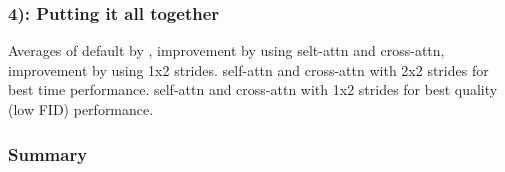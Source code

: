 \begin{figure}[!htb]
    
    
\end{figure}



\newpage
\subsubsection*{4): Putting it all together}
Averages of default by \cite{bolya2023tomesd}, improvement by using selt-attn and cross-attn, improvement by using 1x2 strides. 
self-attn and cross-attn with 2x2 strides for best time performance. self-attn and cross-attn with 1x2 strides for best quality (low FID) performance.
\begin{figure}[!htb]
    
    
\end{figure}



\subsubsection*{Summary}